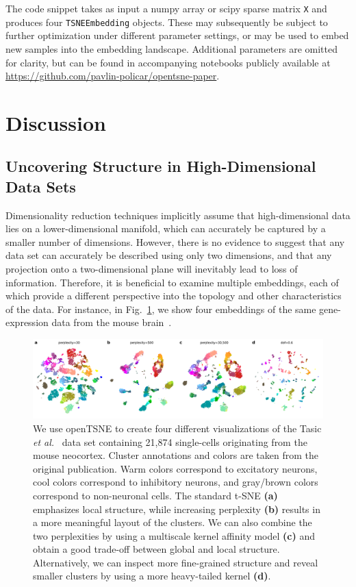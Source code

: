 \documentclass[twocolumn]{bmcart}
\begin{document}
\noindent The code snippet takes as input a \textsf{numpy} array or \textsf{scipy} sparse matrix \texttt{X} and produces four \texttt{TSNEEmbedding} objects. These may subsequently be subject to further optimization under different parameter settings, or may be used to embed new samples into the embedding landscape. Additional parameters are omitted for clarity, but can be found in accompanying notebooks publicly available at \url{https://github.com/pavlin-policar/opentsne-paper}.


\section*{Discussion}

\subsection*{Uncovering Structure in High-Dimensional Data Sets}

Dimensionality reduction techniques implicitly assume that high-dimensional data lies on a lower-dimensional manifold, which can accurately be captured by a smaller number of dimensions. However, there is no evidence to suggest that any data set can accurately be described using only two dimensions, and that any projection onto a two-dimensional plane will inevitably lead to loss of information. Therefore, it is beneficial to examine multiple embeddings, each of which provide a different perspective into the topology and other characteristics of the data. For instance, in Fig.~\ref{fig:tasic}, we show four embeddings of the same gene-expression data from the mouse brain~\cite{tasic2018shared}.

\begin{figure}[htbp]
  \includegraphics[width=\textwidth]{tasic2018}
  \caption{\label{fig:tasic}We use openTSNE to create four different visualizations of the Tasic \textit{et al.}~\cite{tasic2018shared} data set containing 21,874 single-cells originating from the mouse neocortex. Cluster annotations and colors are taken from the original publication. Warm colors correspond to excitatory neurons, cool colors correspond to inhibitory neurons, and gray/brown colors correspond to non-neuronal cells. The standard t-SNE \textbf{(a)} emphasizes local structure, while increasing perplexity \textbf{(b)} results in a more meaningful layout of the clusters. We can also combine the two perplexities by using a multiscale kernel affinity model \textbf{(c)} and obtain a good trade-off between global and local structure. Alternatively, we can inspect more fine-grained structure and reveal smaller clusters by using a more heavy-tailed kernel \textbf{(d)}.}
\end{figure}
\end{document}
